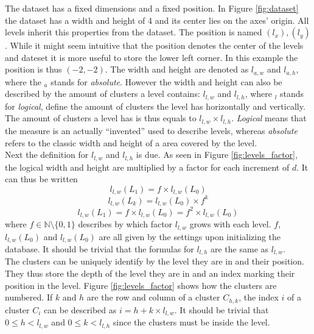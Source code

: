 \documentclass[10pt,a4paper,titlepage]{article}
\begin{document}
	The dataset has a fixed dimensions and a fixed position. In Figure \ref{fig:dataset} the dataset has a width and height of 4 and its center lies on the axes' origin. All levels inherit this properties from the dataset. The position is named \((l_x),(l_y)\). While it might seem intuitive that the position denotes the center of the levels and dateset it is more useful to store the lower left corner. In this example the position is thus \((-2,-2)\). The width and height are denoted as \(l_{a,w}\) and \(l_{a,h}\), where the \(_a\) stands for \emph{absolute}. However the width and height can also be described by the amount of clusters a level contains: \(l_{l,w}\) and \(l_{l,h}\), where \(_l\) stands for \emph{logical}, define the amount of clusters the level has horizontally and vertically. The amount of clusters a level has is thus equals to \(l_{l,w} \times l_{l,h}\). \emph{Logical} means that the measure is an actually ``invented'' used to describe levels, whereas \emph{absolute} refers to the classic width and height of a area covered by the level.\\
	Next the definition for \(l_{l,w}\) and \(l_{l,h}\) is due. As seen in Figure \ref{fig:levels_factor}, the logical width and height are multiplied by a factor for each increment of \(d\). It can thus be written
	\[l_{l,w}(L_1)= f \times l_{l,w}(L_0)\]
	\[l_{l,w}(L_k) = l_{l,w}(L_0) \times f^k\]
	\[l_{l,w}(L_1)= f \times l_{l,w}(L_0) = f^2 \times l_{l,w}(L_0)\]
	where \(f \in \mathbb{N}\setminus\{0,1\}\) describes by which factor \(l_{l,w}\) grows with each level. \(f\), \(l_{l,w}(L_0)\) and \(l_{l,w}(L_0)\) are all given by the settings upon initializing the database. It should be trivial that the formulas for \(l_{l,h}\) are the same as \(l_{l,w}\).\\
	The clusters can be uniquely identify by the level they are in and their position. They thus store the depth of the level they are in and an index marking their position in the level. Figure \ref{fig:levels_factor} shows how the clusters are numbered. If \(k\) and \(h\) are the row and column of a cluster \(C_{h,k}\), the index \(i\) of a cluster \(C_i\) can be described as \(i = h + k \times l_{l,w}\). It should be trivial that \(0 \leq h < l_{l,w}\) and \(0 \leq k < l_{l,h}\) since the clusters must be inside the level.
\end{document}
